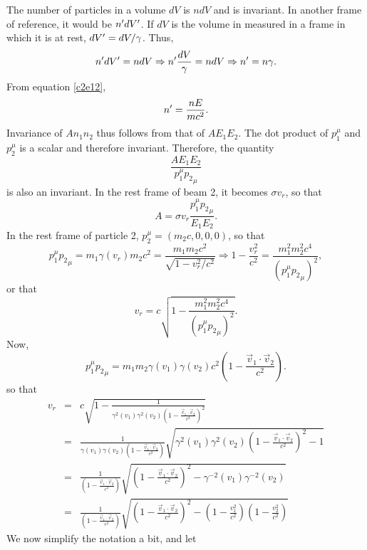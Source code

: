 \begin{enumerate}
The number of particles in a volume $dV$ is $ndV$ and is invariant. In another
frame of reference, it would be $n^\prime dV^\prime$. If $dV$ is the volume in measured
in a frame in which it is at rest, $dV^\prime = dV/\gamma$. Thus,
\begin{equation}\label{c2e48}
n^\prime dV^\prime = n dV \Rightarrow n^\prime\frac{dV}{\gamma} = ndV \Rightarrow n^\prime
= n\gamma.
\end{equation}
From equation \eqref{c2e12}, 
\begin{equation}\label{c2e49}
n^\prime = \frac{nE}{mc^2}.
\end{equation}
Invariance of $An_1n_2$ thus follows from that of $AE_1E_2$. The dot product of
$p_1^\mu$ and $p_2^\mu$ is a scalar and therefore invariant. Therefore, the
quantity
\[
\frac{AE_1E_2}{p_1^\mu {p_2}_\mu}
\]
is also an invariant. In the rest frame of beam 2, it becomes $\sigma v_r$, so that
\begin{equation}\label{c2e50}
A = \sigma v_r\frac{p_1^\mu {p_2}_\mu}{E_1E_2}.
\end{equation}
In the rest frame of particle 2, $p_2^\mu = (m_2c, 0, 0, 0)$, so that 
\[
p_1^\mu {p_2}_\mu = m_1\gamma(v_r) m_2 c^2 = 
\frac{m_1m_2c^2}{\sqrt{1 - v_r^2/c^2}} \Rightarrow 1 - \frac{v_r^2}{c^2} = 
\frac{m_1^2m_2^2c^4}{(p_1^\mu {p_2}_\mu)^2},
\]
or that
\begin{equation}\label{c2e51}
v_r = c\sqrt{1 - \frac{m_1^2m_2^2c^4}{(p_1^\mu {p_2}_\mu)^2}}.
\end{equation}
Now, 
\[
p_1^\mu {p_2}_\mu = m_1m_2\gamma(v_1)\gamma(v_2)c^2\left(1 - \frac{\vec{v}_1\cdot\vec{v}_2}{c^2}\right).
\]
so that
\begin{eqnarray*}
v_r &=& c\sqrt{1 - \frac{1}{\gamma^2(v_1)\gamma^2(v_2)\left(1 - \frac{\vec{v}_1\cdot\vec{v}_2}{c^2}\right)^2}} \\
 &=& \frac{1}{\gamma(v_1)\gamma(v_2)\left(1 - \frac{\vec{v}_1\cdot\vec{v}_2}{c^2}\right)}
 \sqrt{\gamma^2(v_1)\gamma^2(v_2)\left(1 - \frac{\vec{v}_1\cdot\vec{v}_2}{c^2}\right)^2 - 1} \\
 &=& \frac{1}{\left(1 - \frac{\vec{v}_1\cdot\vec{v}_2}{c^2}\right)}
 \sqrt{\left(1 - \frac{\vec{v}_1\cdot\vec{v}_2}{c^2}\right)^2 - \gamma^{-2}(v_1)\gamma^{-2}(v_2)} \\
 &=& \frac{1}{\left(1 - \frac{\vec{v}_1\cdot\vec{v}_2}{c^2}\right)}
 \sqrt{\left(1 - \frac{\vec{v}_1\cdot\vec{v}_2}{c^2}\right)^2 - \left(1 - \frac{v_1^2}{c^2}\right)
 \left(1 - \frac{v_2^2}{c^2}\right)}
\end{eqnarray*}
We now simplify the notation a bit, and let
\begin{eqnarray}

\end{eqnarray}
\end{enumerate}
